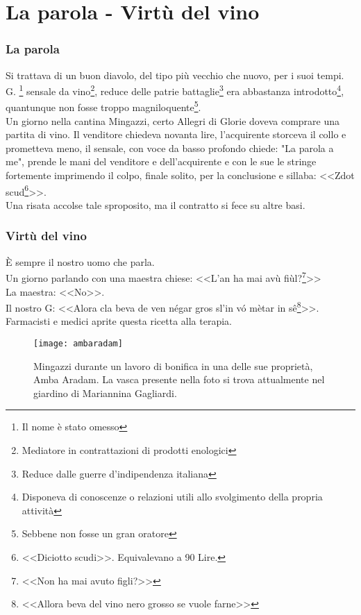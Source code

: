 
\chapter{La parola - Virtù del vino}
\subsection{La parola}
Si trattava di un buon diavolo, del tipo più vecchio che nuovo, per i suoi tempi. G. \: \:\footnote{Il nome è stato omesso} sensale da vino\footnote{Mediatore in contrattazioni di prodotti enologici}, reduce delle patrie battaglie\footnote{Reduce dalle guerre d'indipendenza italiana} era abbastanza introdotto\footnote{Disponeva di conoscenze o relazioni utili allo svolgimento della propria attività}, quantunque non fosse troppo magniloquente\footnote{Sebbene non fosse un gran oratore}.\\
\indent Un giorno nella cantina Mingazzi, certo Allegri di Glorie doveva comprare una partita di vino. Il venditore chiedeva novanta lire, l'acquirente storceva il collo e prometteva meno, il sensale, con voce da basso profondo chiede: "La parola a me", prende le mani del venditore e dell'acquirente e con le sue le stringe fortemente imprimendo il colpo, finale solito, per la conclusione e sillaba: <<Zdot scud\footnote{<<Diciotto scudi>>. Equivalevano a 90 Lire.}>>.\\
\indent Una risata accolse tale sproposito, ma il contratto si fece su altre basi.
\newpage
\subsection{Virtù del vino}
È sempre il nostro uomo che parla.\\
\indent Un giorno parlando con una maestra chiese: <<L'an ha mai avù fiùl?\footnote{<<Non ha mai avuto figli?>>}>>\\
\indent La maestra: <<No>>.\\
\indent Il nostro G: <<Alora cla beva de ven négar gros sl'in vó mètar in sê\footnote{<<Allora beva del vino nero grosso se vuole farne>>}>>.\\
\indent Farmacisti e medici aprite questa ricetta alla terapia. 

\begin{figure}[htb]
    \centering
    \texttt{[image: ambaradam]}
    \caption[Mingazzi durante lavoro di bonifica]{Mingazzi durante un lavoro di bonifica in una delle sue proprietà, Amba Aradam\label{fig:ambaradam}. La vasca presente nella foto si trova attualmente nel giardino di Mariannina Gagliardi.}
\end{figure}